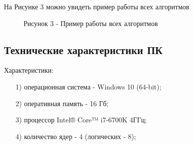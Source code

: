 \documentclass[14pt, a4paper]{extarticle}
\begin{document}
	\newpage
	На Рисунке 3 можно увидеть пример работы всех алгоритмов
	\begin{figure}[h]
		\caption*{Рисунок 3 - Пример работы всех алгоритмов}
	\end{figure}

	
	\subsection{Технические характеристики ПК}
	Характеристики:
	\begin{itemize}
		\item[1)] операционная система - Windows 10 (64-bit);
		\item[2)] оперативная память - 16 Гб;
		\item[3)] процессор Intel® Core™ i7-6700K 4ГГц;
		\item[4)] количество ядер - 4 (логических - 8);
	\end{itemize}
		
\end{document}
